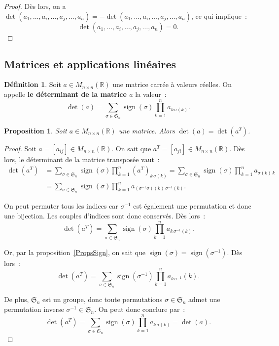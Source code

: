 \documentclass{article}
\DeclareMathOperator{\sign}{sign}
\newcommand{\R}{\mathbb R}
\newcommand{\M}[3]{M_{#1 \times #2}(#3)}
\newcommand{\Perm}{\mathfrak{S}}
\newtheorem{prp}[thm]{Proposition}
\theoremstyle{definition}
\newtheorem{déf}[thm]{Définition}
\theoremstyle{remark}
\begin{document}
\begin{proof}
		Dès lors, on a $\det(a_1, \dotsc, a_i, \dotsc, a_j, \dotsc, a_n) = -\det(a_1, \dotsc, a_i, \dotsc, a_j, \dotsc, a_n)$, ce qui implique~:
		\[\det(a_1, \dotsc, a_i, \dotsc, a_j, \dotsc, a_n) = 0.\] \end{proof}

	\subsection{Matrices et applications linéaires}
		\begin{déf} Soit $a \in \M nn\R$ une matrice carrée à valeurs réelles. On appelle \textbf{le déterminant de la matrice $a$} la valeur~:
		\[\det(a) = \sum_{\sigma\in\Perm_n}\sign(\sigma)\prod_{k=1}^na_{k\,\sigma(k)}.\] \end{déf}

		\begin{prp}\label{detTransposéeEstdetMatrice} Soit $a \in \M nn\R$ une matrice. Alors $\det(a) = \det(a^T)$. \end{prp}

		\begin{proof} Soit $a = [a_{ij}] \in \M nn\R$. On sait que $a^T = [a_{ji}] \in \M nn\R$. Dès lors, le déterminant de la matrice transposée vaut~:
		\[\begin{aligned}
			\det(a^T) &= \sum_{\sigma\in\Perm_n}\sign(\sigma)\prod_{k=1}^n(a^T)_{k\,\sigma(k)} = \sum_{\sigma\in\Perm_n}\sign(\sigma)\prod_{k=1}^na_{\sigma(k)\,k} \\
			          &= \sum_{\sigma\in\Perm_n}\sign(\sigma)\prod_{k=1}^na_{(\sigma^{-1}\sigma)(k)\,\sigma^{-1}(k)}.
		\end{aligned}\]

		On peut permuter tous les indices car $\sigma^{-1}$ est également une permutation et donc une bijection. Les couples d'indices sont donc conservés. Dès lors~:
		\[\det(a^T) = \sum_{\sigma\in\Perm_n}\sign(\sigma)\prod_{k=1}^na_{k\,\sigma^{-1}(k)}.\]

		Or, par la proposition~\ref{PropsSign}, on sait que $\sign(\sigma) = \sign(\sigma^{-1})$. Dès lors~:
		\[\det(a^T) = \sum_{\sigma\in\Perm_n}\sign(\sigma^{-1})\prod_{k=1}^na_{k\,\sigma^{-1}}(k).\]

		De plus, $\Perm_n$ est un groupe, donc toute permutations $\sigma \in \Perm_n$ admet une permutation inverse $\sigma^{-1} \in \Perm_n$.
		On peut donc conclure par~:
		\[\det(a^T) = \sum_{\sigma\in\Perm_n}\sign(\sigma)\prod_{k=1}^na_{k\,\sigma(k)} = \det(a).\] \end{proof}
\end{document}
